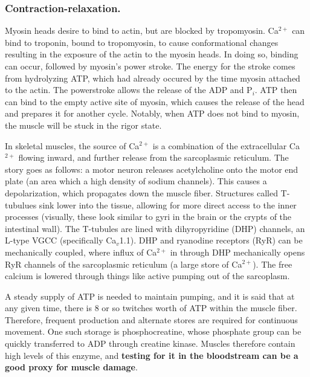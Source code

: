 \documentclass[12pt]{report}
\begin{document}
\subsubsection{Contraction-relaxation.}
Myosin heads desire to bind to actin, but are blocked by tropomyosin. Ca$^{2+}$ can bind to troponin, bound to tropomyosin, to cause conformational changes resulting in the exposure of the actin to the myosin heads. In doing so, binding can occur, followed by myosin's power stroke. The energy for the stroke comes from hydrolyzing ATP, which had already occured by the time myosin attached to the actin. The powerstroke allows the release of the ADP and P$_i$. ATP then can bind to the empty active site of myosin, which causes the release of the head and prepares it for another cycle. Notably, when ATP does not bind to myosin, the muscle will be stuck in the rigor state.\newline

In skeletal muscles, the source of Ca$^{2+}$ is a combination of the extracellular Ca$^{2+}$ flowing inward, and further release from the sarcoplasmic reticulum. The story goes as follows: a motor neuron releases acetylcholine onto the motor end plate (an area which a high density of sodium channels). This causes a depolarization, which propagates down the muscle fiber. Structures called T-tubulues sink lower into the tissue, allowing for more direct access to the inner processes (visually, these look similar to gyri in the brain or the crypts of the intestinal wall). The T-tubules are lined with dihyropyridine (DHP) channels, an L-type VGCC (specifically Ca$_v$1.1). DHP and ryanodine receptors (RyR) can be mechanically coupled, where influx of Ca$^{2+}$ in through DHP mechanically opens RyR channels of the sarcoplasmic reticulum (a large store of Ca$^{2+}$). The free calcium is lowered through things like active pumping out of the sarcoplasm.\newline

A steady supply of ATP is needed to maintain pumping, and it is said that at any given time, there is 8 or so twitches worth of ATP within the muscle fiber. Therefore, frequent production and alternate stores are required for continuous movement. One such storage is phosphocreatine, whose phosphate group can be quickly transferred to ADP through creatine kinase. Muscles therefore contain high levels of this enzyme, and \textbf{testing for it in the bloodstream can be a good proxy for muscle damage}.\newline
\end{document}
